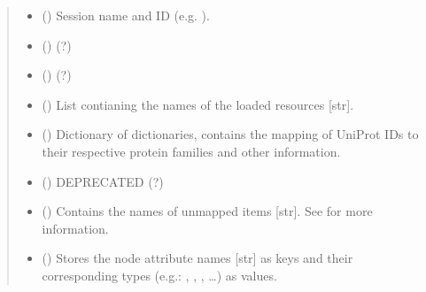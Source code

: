 \documentclass[letterpaper,10pt,english]{sphinxmanual}
\begin{document}
\begin{fulllineitems}
\begin{quote}
\begin{description}
\begin{itemize}
\item {} 
 () \textendash{} Session name and ID (e.g. ).

\item {} 
 () \textendash{} (?)

\item {} 
 () \textendash{} (?)

\item {} 
 () \textendash{} List contianing the names of the loaded resources {[}str{]}.

\item {} 
 () \textendash{} Dictionary of dictionaries, contains the mapping of UniProt IDs
to their respective protein families and other information.

\item {} 
 () \textendash{} DEPRECATED (?)

\item {} 
 () \textendash{} Contains the names of unmapped items {[}str{]}. See
{\hyperref[\detokenize{reference:pypath.main.PyPath.map_item}]{}} for more information.

\item {} 
 () \textendash{} Stores the node attribute names {[}str{]} as keys and their
corresponding types (e.g.: , , , …) as
values.

\end{itemize}

\end{description}\end{quote}


\end{fulllineitems}
\end{document}
